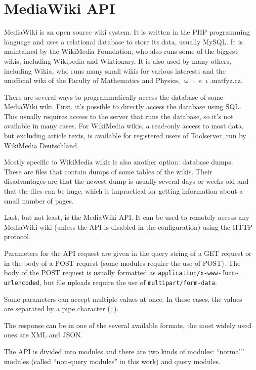 \chapter{MediaWiki API}

MediaWiki is an open source wiki system.
It is written in the PHP programming language and uses a relational database to store its data, usually MySQL.
It is maintained by the WikiMedia Foundation, who also runs some of the biggest wikis, including Wikipedia and Wiktionary.
It is also used by many others, including Wikia, who runs many small wikis for various interests and
the unofficial wiki of the Faculty of Mathematics and Physics, $\upomega\upiota\upkappa\upiota$.matfyz.cz.

There are several ways to programmatically access the database of some MediaWiki wiki.
First, it's possible to directly access the database using SQL.
This usually requires access to the server that runs the database, so it's not available in many cases.
For WikiMedia wikis, a read-only access to most data, but excluding article texts,
is available for registered users of Toolserver, run by WikiMedia Deutschland.

Mostly specific to WikiMedia wikis is also another option: database dumps. These are files that contain
dumps of some tables of the wikis. Their disadvantages are that the newest dump is usually several days or weeks old
and that the files can be huge, which is impractical for getting information about a small number of pages.

Last, but not least, is the MediaWiki API.
It can be used to remotely access any MediaWiki wiki (unless the API is disabled in the configuration)
using the HTTP protocol.

Parameters for the API request are given in the query string of a GET request or in the body of a POST request
(some modules require the use of POST).
The body of the POST request is usually formatted as \texttt{application/x-www-form-urlencoded},
but file uploads require the use of \texttt{multipart/form-data}.

Some parameters can accept multiple values at once.
In these cases, the values are separated by a pipe character (\texttt{|}).

The response can be in one of the several available formats, the most widely used ones are XML and JSON.

The API is divided into modules and there are two kinds of modules:
``normal'' modules (called ``non-query modules'' in this work) and query modules.

